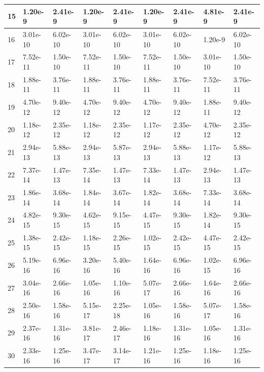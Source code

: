 \documentclass[rocnikovka]{gzwroc} %
\begin{document}
\begin{table}[h!]
\begin{tabular}{|l|l|l|l|l|l|l|l|l|}
15 & 1.20e-9 & 2.41e-9 & 1.20e-9 & 2.41e-9 & 1.20e-9 & 2.41e-9 & 4.81e-9 & 2.41e-9 \\ \hline 
16 & 3.01e-10 & 6.02e-10 & 3.01e-10 & 6.02e-10 & 3.01e-10 & 6.02e-10 & 1.20e-9 & 6.02e-10 \\ \hline 
17 & 7.52e-11 & 1.50e-10 & 7.52e-11 & 1.50e-10 & 7.52e-11 & 1.50e-10 & 3.01e-10 & 1.50e-10 \\ \hline 
18 & 1.88e-11 & 3.76e-11 & 1.88e-11 & 3.76e-11 & 1.88e-11 & 3.76e-11 & 7.52e-11 & 3.76e-11 \\ \hline 
19 & 4.70e-12 & 9.40e-12 & 4.70e-12 & 9.40e-12 & 4.70e-12 & 9.40e-12 & 1.88e-11 & 9.40e-12 \\ \hline 
20 & 1.18e-12 & 2.35e-12 & 1.18e-12 & 2.35e-12 & 1.17e-12 & 2.35e-12 & 4.70e-12 & 2.35e-12 \\ \hline 
21 & 2.94e-13 & 5.88e-13 & 2.94e-13 & 5.87e-13 & 2.94e-13 & 5.88e-13 & 1.17e-12 & 5.88e-13 \\ \hline 
22 & 7.37e-14 & 1.47e-13 & 7.35e-14 & 1.47e-13 & 7.33e-14 & 1.47e-13 & 2.94e-13 & 1.47e-13 \\ \hline 
23 & 1.86e-14 & 3.68e-14 & 1.84e-14 & 3.67e-14 & 1.82e-14 & 3.68e-14 & 7.33e-14 & 3.68e-14 \\ \hline 
24 & 4.82e-15 & 9.30e-15 & 4.62e-15 & 9.15e-15 & 4.47e-15 & 9.30e-15 & 1.82e-14 & 9.30e-15 \\ \hline 
25 & 1.38e-15 & 2.42e-15 & 1.18e-15 & 2.26e-15 & 1.02e-15 & 2.42e-15 & 4.47e-15 & 2.42e-15 \\ \hline 
26 & 5.19e-16 & 6.96e-16 & 3.20e-16 & 5.40e-16 & 1.64e-16 & 6.96e-16 & 1.02e-15 & 6.96e-16 \\ \hline 
27 & 3.04e-16 & 2.66e-16 & 1.05e-16 & 1.10e-16 & 5.07e-17 & 2.66e-16 & 1.64e-16 & 2.66e-16 \\ \hline 
28 & 2.50e-16 & 1.58e-16 & 5.15e-17 & 2.25e-18 & 1.05e-16 & 1.58e-16 & 5.07e-17 & 1.58e-16 \\ \hline 
29 & 2.37e-16 & 1.31e-16 & 3.81e-17 & 2.46e-17 & 1.18e-16 & 1.31e-16 & 1.05e-16 & 1.31e-16 \\ \hline 
30 & 2.33e-16 & 1.25e-16 & 3.47e-17 & 3.14e-17 & 1.21e-16 & 1.25e-16 & 1.18e-16 & 1.25e-16 \\ \hline 
\end{tabular}
\end{table}
\end{document}
